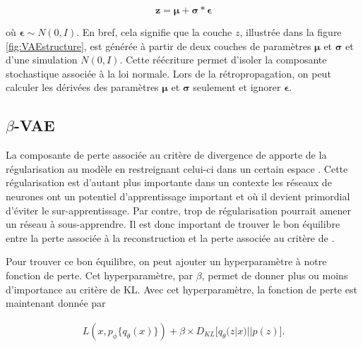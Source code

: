 \begin{equation} \label{eq:latent_formula}
\boldsymbol{z} = \boldsymbol{\mu} + \boldsymbol{\sigma} *\boldsymbol{\epsilon}
\end{equation}

où $\boldsymbol{\epsilon} \sim N(0,I)$. En bref, cela signifie que la couche $z$, illustrée dans la figure \ref{fig:VAEstructure}, est générée à partir de deux couches de paramètres $\boldsymbol{\mu}$ et $\boldsymbol{\sigma}$ et d'une simulation $N(0,I)$. Cette réécriture permet d'isoler la composante stochastique associée à la loi normale. Lors de la rétropropagation, on peut calculer les dérivées des paramètres $\boldsymbol{\mu}$ et $\boldsymbol{\sigma}$ seulement et ignorer $\boldsymbol{\epsilon}$. 

\subsection{$\beta$-VAE} \label{beta-vae}

La composante de perte associée au critère de divergence de \DIFdelbegin {}\DIFdelend \DIFaddbegin {}\DIFaddend apporte de la régularisation au modèle en restreignant celui-ci dans un certain espace \citep{kingma2013autoencoding}. Cette régularisation est d'autant plus importante dans un contexte \DIFdelbegin {}\DIFdelend \DIFaddbegin {}\DIFaddend les réseaux de neurones ont un potentiel d'apprentissage important et où il devient primordial d'éviter le sur-apprentissage. Par contre, trop de régularisation pourrait amener un réseau à sous-apprendre. Il est donc important de trouver le bon équilibre entre la perte associée à la reconstruction et la perte associée au critère de \DIFdelbegin {}\DIFdelend \DIFaddbegin {}\DIFaddend .

Pour trouver ce bon équilibre, on peut ajouter un hyperparamètre à notre fonction de perte. Cet hyperparamètre, \DIFdelbegin {}\DIFdelend \DIFaddbegin {}\DIFaddend par $\beta$, permet de donner plus ou moins d'importance au critère de KL. Avec cet hyperparamètre, la fonction de perte est maintenant donnée par
\DIFdelbegin \DIFdel{:
}\DIFdelend 

\begin{gather}  \label{eq:loss_betavae}
L(x, p_\phi\{q_\theta(x)\}) +  \beta \times D_{KL}\big[q_\theta(z|x) || p(z)\big].
\end{gather}


